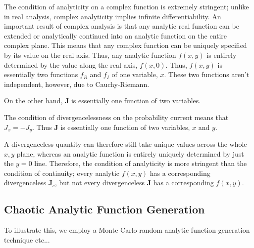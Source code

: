 The condition of analyticity on a complex function is extremely stringent;
unlike in real analysis, complex analyticity implies infinite differentiability.
An important result of complex analysis is that any analytic real function can
be extended or analytically continued into an analytic function on the entire
complex plane. This means that any complex function can be uniquely specified by
its value on the real axis. Thus, any analytic function $f(x,y)$ is entirely
determined by the value along the real axis, $f(x,0)$. Thus, $f(x,y)$ is
essentially two functions $f_R$ and $f_I$ of one variable, $x$. These two
functions aren't independent, however, due to Cauchy-Riemann.

On the other hand, $\mathbf{J}$ is essentially one function of two variables.

The condition of divergencelessness on the probability current means that $J_x =
- J_y$. Thus $\mathbf{J}$ is essentially one function of two variables, $x$ and
$y$.

A divergenceless quantity can therefore still take unique values across the
whole $x,y$ plane, whereas an analytic function is entirely uniquely determined
by just the $y = 0$ line. Therefore, the condition of analyticity is more
stringent than the condition of continuity; every analytic $f(x,y)$ has a
corresponding divergenceless $\mathbf{J}_c$, but not every divergenceless
$\mathbf{J}$ has a corresponding $f(x,y)$.

\subsection{Chaotic Analytic Function Generation}

To illustrate this, we employ a Monte Carlo random analytic function generation
technique etc...
